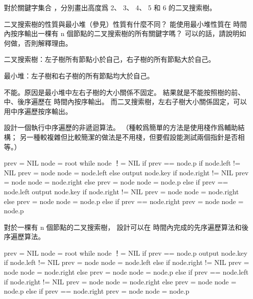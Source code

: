 \startsection[
  title={What is a binary search tree?},
]

\startEXERCISE
對於關鍵字集合 ，分別畫出高度爲 2、 3、 4、 5 和 6 的二叉搜索樹。
\stopEXERCISE

\startANSWER
\externalfigure[output/e12_1_1-1]
\externalfigure[output/e12_1_1-2]
\externalfigure[output/e12_1_1-3]
\externalfigure[output/e12_1_1-4]
\externalfigure[output/e12_1_1-5]
\stopANSWER

\startEXERCISE
二叉搜索樹的性質與最小堆（參見）性質有什麼不同？
能使用最小堆性質在  時間內按序輸出一棵有 n 個節點的二叉搜索樹的所有關鍵字嗎？
可以的話，請說明如何做，否則解釋理由。
\stopEXERCISE

\startANSWER
二叉搜索樹：左子樹所有節點小於自己，右子樹的所有節點大於自己。

最小堆：左子樹和右子樹的所有節點均大於自己。

不能。原因是最小堆中左右子樹的大小關係不固定。
結果就是不能按照樹的前、中、後序遍歷在  時間內按序輸出。
而二叉搜索樹，左右子樹大小關係固定，可以用中序遍歷按序輸出。
\stopANSWER

\startEXERCISE
設計一個執行中序遍歷的非遞迴算法。
（\hint 種較爲簡單的方法是使用棧作爲輔助結構；
另一種較複雜但比較簡潔的做法是不用棧，但要假設能測試兩個指針是否相等。）
\stopEXERCISE

\startANSWER
{}
\startCLRS
prev = NIL
node = root
while node ！= NIL
	if prev == node.p
		if node.left != NIL
			prev = node
			node = node.left
		else
			output node.key
			if node.right != NIL
				prev = node
				node = node.right
			else
				prev = node
				node = node.p
	else if prev == node.left
		output node.key
		if node.right != NIL
			prev = node
			node = node.right
		else
			prev = node
			node = node.p
	else if prev == node.right
		prev = node
		node = node.p
\stopCLRS
\stopANSWER

\startEXERCISE
對於一棵有 n 個節點的二叉搜索樹，
設計可以在  時間內完成的先序遍歷算法和後序遍歷算法。
\stopEXERCISE

\startANSWER
{}
\startCLRS
prev = NIL
node = root
while node ！= NIL
	if prev == node.p
		output node.key
		if node.left != NIL
			prev = node
			node = node.left
		else
			if node.right != NIL
				prev = node
				node = node.right
			else
				prev = node
				node = node.p
	else if prev == node.left
		if node.right != NIL
			prev = node
			node = node.right
		else
			prev = node
			node = node.p
	else if prev == node.right
		prev = node
		node = node.p
\stopCLRS


